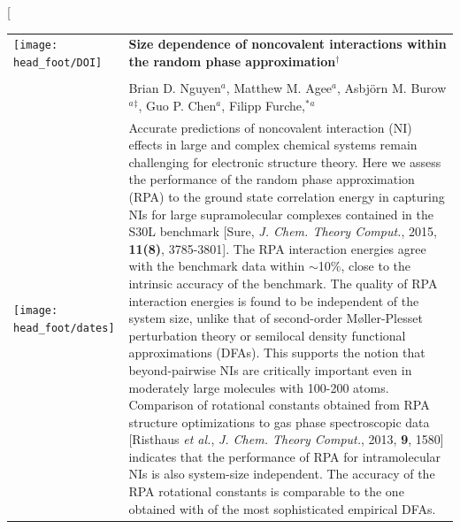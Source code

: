 \documentclass[twoside,twocolumn,9pt]{article}
\begin{document}
\twocolumn[
  \begin{@twocolumnfalse}
\vspace{3cm}
\sffamily
\begin{tabular}{m{4.5cm} p{13.5cm} }

\texttt{[image: head\_foot/DOI]} & \noindent\LARGE{\textbf{Size
    dependence of noncovalent interactions within the random phase
    approximation$^\dag$}} \\%
\vspace{0.3cm} & \vspace{0.3cm} \\

 & \noindent\large{
Brian D. Nguyen\textit{$^{a}$}, Matthew M. Agee\textit{$^{a}$}, Asbj{\"o}rn
   M. Burow\textit{$^{a}$}\textit{$^{\ddag}$}, Guo
   P. Chen\textit{$^{a}$}, Filipp Furche,$^{\ast}$\textit{$^{a}$}}
 \\%

\texttt{[image: head\_foot/dates]} & \noindent\normalsize{
Accurate predictions of noncovalent interaction (NI) effects in
large and complex chemical systems remain challenging for 
electronic structure theory. Here we assess the performance of the
random phase approximation (RPA) to the ground state correlation energy
in capturing NIs for large supramolecular complexes contained in the
S30L benchmark [Sure, \textit{J. Chem. Theory Comput.}, 2015, \textbf{11(8)},
3785-3801]. The RPA interaction energies agree with the benchmark data within
$\sim$10$\%$, close to the intrinsic accuracy of the benchmark. The quality of
RPA interaction energies is found to be independent of the system size, unlike
that of second-order M{\o}ller-Plesset perturbation theory or semilocal
density functional approximations (DFAs). This supports the notion that
beyond-pairwise NIs are critically important even in moderately large
molecules with 100-200 atoms. Comparison of rotational constants obtained
from RPA structure optimizations to gas phase spectroscopic data
[Risthaus \textit{et al.}, \textit{J. Chem. Theory Comput.}, 2013, \textbf{9}, 1580]
indicates that the performance of RPA for intramolecular NIs is also
system-size independent. The accuracy of the RPA rotational
constants is comparable to the one obtained with of the most
sophisticated empirical DFAs.
 } \\%

\end{tabular}

 \end{@twocolumnfalse} \vspace{0.6cm}
\end{document}
